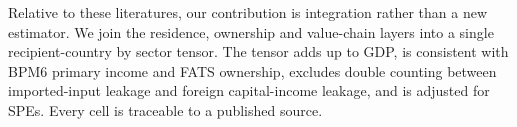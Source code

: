 Relative to these literatures, our contribution is integration rather than a new estimator.
We join the residence, ownership and value-chain layers into a single recipient-country by sector tensor.
The tensor adds up to GDP, is consistent with BPM6 primary income and FATS ownership, excludes double counting between imported-input leakage and foreign capital-income leakage, and is adjusted for SPEs.
Every cell is traceable to a published source.
